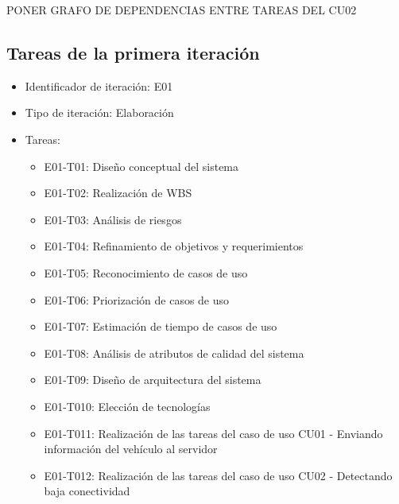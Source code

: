 PONER GRAFO DE DEPENDENCIAS ENTRE TAREAS DEL CU02


\subsection{Tareas de la primera iteración}

\begin{itemize}
\item Identificador de iteración: E01
\item Tipo de iteración: Elaboración
\item Tareas:
\begin{itemize}
\item E01-T01: Diseño conceptual del sistema 
\item E01-T02: Realización de WBS 
\item E01-T03: Análisis de riesgos 
\item E01-T04: Refinamiento de objetivos y requerimientos 
\item E01-T05: Reconocimiento de casos de uso
\item E01-T06: Priorización de casos de uso
\item E01-T07: Estimación de tiempo de casos de uso 
\item E01-T08: Análisis de atributos de calidad del sistema 
\item E01-T09: Diseño de arquitectura del sistema 
\item E01-T010: Elección de tecnologías 
\item E01-T011: Realización de las tareas del caso de uso CU01 - Enviando información del vehículo al servidor 
\item E01-T012: Realización de las tareas del caso de uso CU02 - Detectando baja conectividad 
\end{itemize}
\end{itemize}



